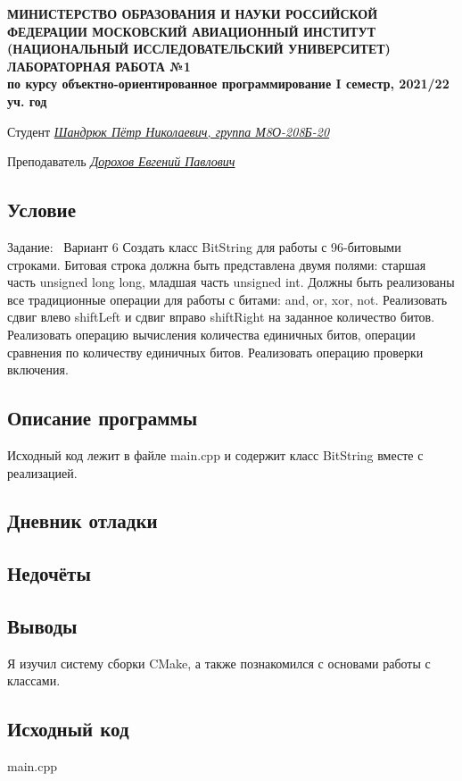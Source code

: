 \documentclass[12pt]{article}
\begin{document}
\begin{titlepage}
\begin{center}
\textbf{МИНИСТЕРСТВО ОБРАЗОВАНИЯ И НАУКИ РОССИЙСКОЙ ФЕДЕРАЦИИ
\medskip
МОСКОВСКИЙ АВИАЦИОННЫЙ ИНСТИТУТ
(НАЦИОНАЛЬНЫЙ ИССЛЕДОВАТЕЛЬСКИЙ УНИВЕРСИТЕТ)
\vfill\vfill
{\Huge ЛАБОРАТОРНАЯ РАБОТА №1} \\
по курсу объектно-ориентированное программирование
I семестр, 2021/22 уч. год}
\end{center}
\vfill

Студент \uline{\it {Шандрюк Пётр Николаевич, группа М8О-208Б-20}\hfill}

Преподаватель \uline{\it {Дорохов Евгений Павлович}\hfill}

\vfill
\end{titlepage}

\subsection*{Условие}

Задание: \
Вариант 6
Создать класс BitString для работы с 96-битовыми строками. Битовая
строка должна быть представлена двумя полями: старшая часть unsigned
long long, младшая часть unsigned int. Должны быть реализованы все
традиционные операции для работы с битами: and, or, xor, not. Реализовать
сдвиг влево shiftLeft и сдвиг вправо shiftRight на заданное количество битов.
Реализовать операцию вычисления количества единичных битов, операции
сравнения по количеству единичных битов. Реализовать операцию проверки
включения.

\subsection*{Описание программы}

Исходный код лежит в файле main.cpp и содержит класс BitString вместе с реализацией.


\subsection*{Дневник отладки}


\subsection*{Недочёты}


\subsection*{Выводы}

Я изучил систему сборки CMake, а также познакомился с основами работы с классами.


\vfill

\subsection*{Исходный код}

    
{\Huge main.cpp}
\inputminted{C++}{main.cpp}
    \pagebreak
    
\end{document}
